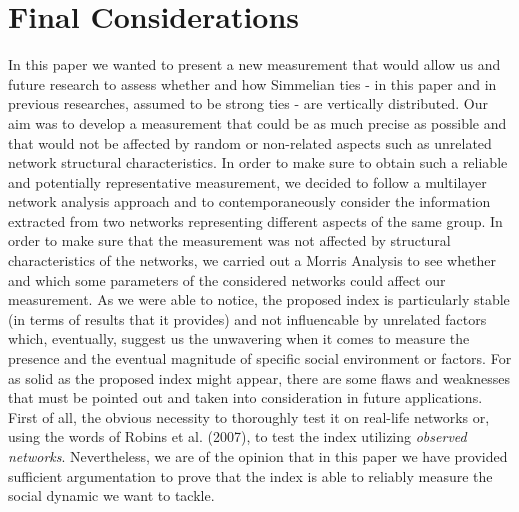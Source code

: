 \documentclass{article}
\begin{document}
\section{Final Considerations}
In this paper we wanted to present a new measurement that would allow us and future research to assess whether and how Simmelian ties - in this paper and in previous researches, assumed to be strong ties - are vertically distributed. Our aim was to develop a measurement that could be as much precise as possible and that would not be affected by random or non-related aspects such as unrelated network structural characteristics. In order to make sure to obtain such a reliable and potentially representative measurement, we decided to follow a multilayer network analysis approach and to contemporaneously consider the information extracted from two networks representing different aspects of the same group. In order to make sure that the measurement was not affected by structural characteristics of the networks, we carried out a Morris Analysis to see whether and which some parameters of the considered networks could affect our measurement. As we were able to notice, the proposed index is particularly stable (in terms of results that it provides) and not influencable by unrelated factors which, eventually, suggest us the unwavering when it comes to measure the presence and the eventual magnitude of specific social environment or factors. 
For as solid as the proposed index might appear, there are some flaws and weaknesses that must be pointed out and taken into consideration in future applications. First of all, the obvious necessity to thoroughly test it on real-life networks or, using the words of Robins et al. (2007), to test the index utilizing \emph{observed networks}. Nevertheless, we are of the opinion that in this paper we have provided sufficient argumentation to prove that the index is able to reliably measure the social dynamic we want to tackle.
\end{document}
